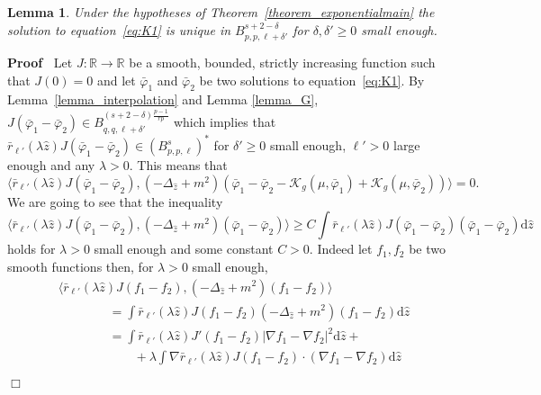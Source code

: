 \documentclass[a4paper,10pt]{article}
\newcommand{\asterisk}{\mathord{*}}
\newcommand{\mathd}{\mathrm{d}}
\newenvironment{proof}{\noindent\textbf{Proof\ }}{\hspace*{\fill}$\Box$\medskip}
\newtheorem{lemma}[theorem]{Lemma}
\begin{document}
\begin{lemma}
  \label{lemma_exponentialuniqueness}Under the hypotheses of
  Theorem~\ref{theorem_exponentialmain} the solution to
  equation~{\eqref{eq:K1}} is unique in $B^{s + 2 - \delta}_{p, p, \ell +
  \delta'}$ for $\delta, \delta' \geqslant 0$ small enough.
\end{lemma}

\begin{proof}
  Let $J : \mathbb{R} \rightarrow \mathbb{R}$ be a smooth, bounded, strictly
  increasing function such that $J (0) = 0$ and let $\bar{\varphi}_1$ and
  $\bar{\varphi}_2$ be two solutions to equation~{\eqref{eq:K1}}. By Lemma~\ref{lemma_interpolation} and Lemma \ref{lemma_G}, $J
  (\bar{\varphi}_1 - \bar{\varphi}_2) \in B^{(s + 2 - \delta) \frac{p - 1}{r
  p}}_{q, q, \ell + \delta'}$ which implies that $\bar{r}_{\ell'} (\lambda
  \hat{z}) J (\bar{\varphi}_1 - \bar{\varphi}_2) \in (B^s_{p, p,
  \ell})^{\asterisk}$ for $\delta' \geqslant 0$ small enough, $\ell' > 0$
  large enough and any $\lambda > 0$. This means that
  \[ \langle \bar{r}_{\ell'} (\lambda \hat{z}) J (\bar{\varphi}_1 -
     \bar{\varphi}_2), (- \Delta_{\hat{z}} + m^2) (\bar{\varphi}_1 -
     \bar{\varphi}_2 - \mathcal{K}_g (\mu, \bar{\varphi}_1) + \mathcal{K}_g
     (\mu, \bar{\varphi}_2)) \rangle = 0. \]
  We are going to see that the inequality
  \[ \langle \bar{r}_{\ell'} (\lambda \hat{z}) J (\bar{\varphi}_1 -
     \bar{\varphi}_2), (- \Delta_{\hat{z}} + m^2) (\bar{\varphi}_1 -
     \bar{\varphi}_2) \rangle \geqslant C \int \bar{r}_{\ell'} (\lambda
     \hat{z}) J (\bar{\varphi}_1 - \bar{\varphi}_2) (\bar{\varphi}_1 -
     \bar{\varphi}_2) \mathd \hat{z} \]
  holds for $\lambda > 0$ small enough and some constant $C > 0$. Indeed let
  $f_1, f_2$ be two smooth functions then, for $\lambda > 0$ small enough,
  \[ \begin{array}{l}
       \langle \bar{r}_{\ell'} (\lambda \hat{z}) J (f_1 - f_2), (-
       \Delta_{\hat{z}} + m^2) (f_1 - f_2) \rangle\\
       \qquad \qquad = \int \bar{r}_{\ell'} (\lambda \hat{z}) J (f_1 - f_2) (-
       \Delta_{\hat{z}} + m^2) (f_1 - f_2) \mathd \hat{z}\\
       \qquad \qquad = \int \bar{r}_{\ell'} (\lambda \hat{z}) J' (f_1 - f_2) |
       \nabla f_1 - \nabla f_2 |^2 \mathd \hat{z} +\\
       \qquad \hspace{4em} + \lambda \int \nabla \bar{r}_{\ell'} (\lambda
       \hat{z}) J (f_1 - f_2) \cdot (\nabla f_1 - \nabla f_2) \mathd \hat{z}\\

\end{array}\]
\end{proof}
\end{document}
